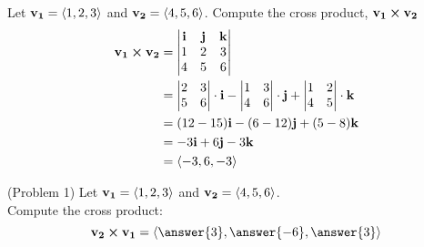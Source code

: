 \documentclass[handout]{ximera}
\begin{document}
\begin{example}[Example 1]
Let $\mathbf{v_1} = \left\langle 1,2,3\right\rangle$ and $\mathbf{v_2} = \left\langle 4, 5, 6\right\rangle$.  
Compute the cross product, $\mathbf{v_1} \boldsymbol\times \mathbf{v_2}$\\
\begin{align*}
\mathbf{v_1} \boldsymbol\times \mathbf{v_2} &= \begin{vmatrix}
\mathbf{i} & \mathbf{j} & \mathbf{k}\\
1 & 2 & 3\\
4 & 5 & 6
\end{vmatrix}\\ 
&= \begin{vmatrix}
 2 & 3  \\
 5 & 6 \\
 \end{vmatrix} \cdot \mathbf i
 - \begin{vmatrix}
 1 & 3  \\
 4 & 6 \\
 \end{vmatrix} \cdot \mathbf j
 + \begin{vmatrix}
 1 & 2  \\
 4 & 5 \\
 \end{vmatrix} \cdot \mathbf k\\
 &= (12-15)\mathbf i - (6 - 12) \mathbf j + (5-8) \mathbf k\\
 &= -3\mathbf i + 6 \mathbf j -3 \mathbf k\\
 &= \left\langle -3, 6, -3\right\rangle
 \end{align*}
 \end{example}

\begin{problem}(Problem 1)
Let $\mathbf{v_1} = \left\langle 1,2,3\right\rangle$ and $\mathbf{v_2} = \left\langle 4, 5, 6\right\rangle$.\\  
Compute the cross product: 
\[
\vec{v_2} \cross \vec{v_1} = \vector{\answer{3}, \answer{-6}, \answer{3}}
\]
\end{problem}
\end{document}
